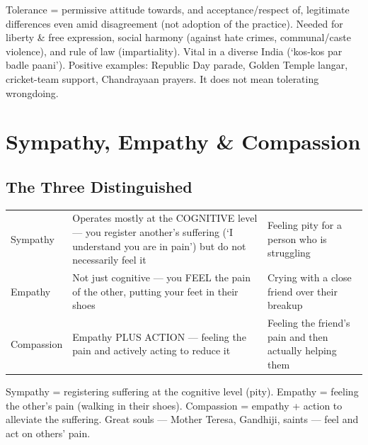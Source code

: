 \begin{QuickRevision}
Tolerance = permissive attitude towards, and acceptance/respect of, legitimate differences even amid disagreement (not adoption of the practice). Needed for liberty \& free expression, social harmony (against hate crimes, communal/caste violence), and rule of law (impartiality). Vital in a diverse India (`kos-kos par badle paani'). Positive examples: Republic Day parade, Golden Temple langar, cricket-team support, Chandrayaan prayers. It does not mean tolerating wrongdoing.
\end{QuickRevision}

\section{Sympathy, Empathy \& Compassion}

\subsection{The Three Distinguished}

\begin{center}
\begin{tabularx}{\textwidth}{>{\raggedright\arraybackslash}p{2.3cm} Y Y}
 &  &  \\
\toprule
Sympathy & Operates mostly at the COGNITIVE level --- you register another's suffering (`I understand you are in pain') but do not necessarily feel it & Feeling pity for a person who is struggling \\
Empathy & Not just cognitive --- you FEEL the pain of the other, putting your feet in their shoes & Crying with a close friend over their breakup \\
Compassion & Empathy PLUS ACTION --- feeling the pain and actively acting to reduce it & Feeling the friend's pain and then actually helping them \\
\bottomrule
\end{tabularx}
\end{center}

\begin{KeyConcept}
Sympathy = registering suffering at the cognitive level (pity). Empathy = feeling the other's pain (walking in their shoes). Compassion = empathy + action to alleviate the suffering. Great souls --- Mother Teresa, Gandhiji, saints --- feel and act on others' pain.
\end{KeyConcept}

